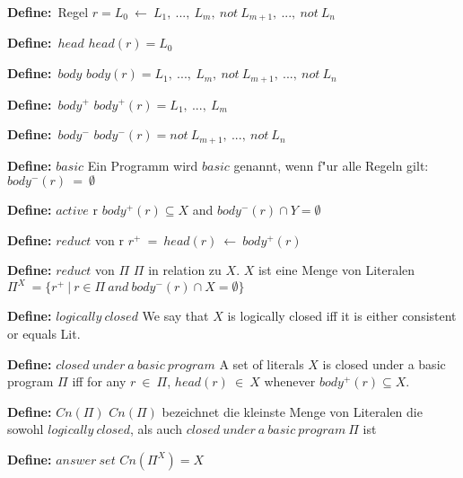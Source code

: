 {\textbf{Define:}~Regel}
  $r = L_0~\leftarrow~L_1,~...,~L_m,~not~L_{m+1},~...,~not~L_n$

{\textbf{Define:}~$head$}
  $head(r) = L_0$

{\textbf{Define:}~$body$}
  $body(r) = {L_1,~...,~L_m,~not~L_{m+1},~...,~not~L_n}$



{\textbf{Define:}~$body^+$}
  $body^+(r) = {L_1,~...,~L_m}$

{\textbf{Define:}~$body^-$}
  $body^-(r) = {not~L_{m+1},~...,~not~L_n}$

{\textbf{Define:} $basic$}
  Ein Programm wird $basic$ genannt, wenn f"ur alle Regeln gilt:\\
  $body^-(r)~=~\emptyset$



{\textbf{Define:} $active$ r}
  $body^+(r) \subseteq X$ and $body^-(r) \cap Y = \emptyset$

{\textbf{Define:} $reduct$ von r}
  $r^+~=~head(r)~\leftarrow~body^+(r)$

{\textbf{Define:} $reduct$ von $\Pi$}
  $\Pi$ in relation zu $X$. $X$ ist eine Menge von Literalen\\
  $\Pi^X~=\{r^+~|~r \in \Pi~and~body^-(r) \cap X = \emptyset \}$



{\textbf{Define:} $logically~closed$}
  We say that $X$ is logically closed iff it is either consistent or equals Lit.

{\textbf{Define:} $closed~under~a~basic~program$}
  A set of literals $X$ is closed under a basic program $\Pi$ iff for
  any $r~\in~\Pi$, $head(r)~\in~X$ whenever $body^+(r) \subseteq X$.



{\textbf{Define:} $Cn(\Pi)$}
  $Cn(\Pi)$ bezeichnet die kleinste Menge von Literalen die sowohl
  $logically~closed$, als auch $closed~under~a~basic~program~\Pi$ ist

{\textbf{Define:} $answer~set$}
  $Cn(\Pi^X)=X$


